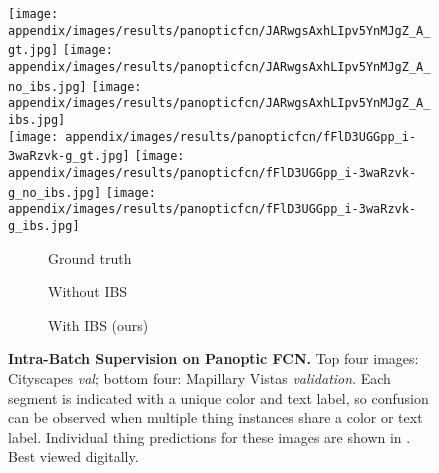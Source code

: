 \documentclass[10pt,twocolumn,letterpaper]{article}
\begin{document}
\begin{figure*}[t]
\texttt{[image: appendix/images/results/panopticfcn/JARwgsAxhLIpv5YnMJgZ\_A\_gt.jpg]}
\texttt{[image: appendix/images/results/panopticfcn/JARwgsAxhLIpv5YnMJgZ\_A\_no\_ibs.jpg]}
\texttt{[image: appendix/images/results/panopticfcn/JARwgsAxhLIpv5YnMJgZ\_A\_ibs.jpg]}
\\

\texttt{[image: appendix/images/results/panopticfcn/fFlD3UGGpp\_i-3waRzvk-g\_gt.jpg]}
\texttt{[image: appendix/images/results/panopticfcn/fFlD3UGGpp\_i-3waRzvk-g\_no\_ibs.jpg]}
\texttt{[image: appendix/images/results/panopticfcn/fFlD3UGGpp\_i-3waRzvk-g\_ibs.jpg]}
\\


\begin{subfigure}[b]{0.28\textwidth}
 \centering
 \caption{Ground truth}
\end{subfigure}
\begin{subfigure}[b]{0.28\textwidth}
 \centering
 \caption{Without IBS}
\end{subfigure}
\begin{subfigure}[b]{0.28\textwidth}
 \centering
 \caption{With IBS (ours)}
\end{subfigure}

\vspace{-10pt}
\caption{\textbf{Intra-Batch Supervision on Panoptic FCN.} Top four images: Cityscapes \textit{val}; bottom four: Mapillary Vistas \textit{validation}. Each segment is indicated with a unique color and text label, so confusion can be observed when multiple thing instances share a color or text label. Individual thing predictions for these images are shown in . Best viewed digitally.}  
\label{fig:results_panfcn_overall}
\end{figure*} 
\end{document}
